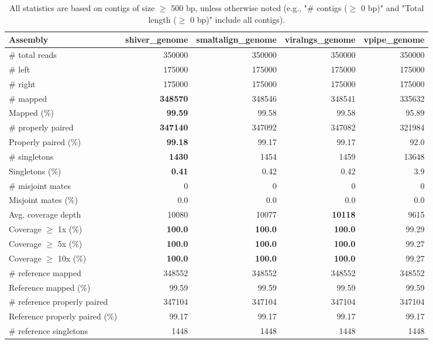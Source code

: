 \documentclass[12pt,a4paper]{article}
\begin{document}
\begin{table}[ht]
\begin{center}
\caption{All statistics are based on contigs of size $\geq$ 500 bp, unless otherwise noted (e.g., "\# contigs ($\geq$ 0 bp)" and "Total length ($\geq$ 0 bp)" include all contigs).}
\begin{tabular}{|l*{4}{|r}|}
\hline
Assembly & shiver\_genome & smaltalign\_genome & viralngs\_genome & vpipe\_genome \\ \hline
\# total reads & 350000 & 350000 & 350000 & 350000 \\ \hline
\# left & 175000 & 175000 & 175000 & 175000 \\ \hline
\# right & 175000 & 175000 & 175000 & 175000 \\ \hline
\# mapped & {\bf 348570} & 348546 & 348541 & 335632 \\ \hline
Mapped (\%) & {\bf 99.59} & 99.58 & 99.58 & 95.89 \\ \hline
\# properly paired & {\bf 347140} & 347092 & 347082 & 321984 \\ \hline
Properly paired (\%) & {\bf 99.18} & 99.17 & 99.17 & 92.0 \\ \hline
\# singletons & {\bf 1430} & 1454 & 1459 & 13648 \\ \hline
Singletons (\%) & {\bf 0.41} & 0.42 & 0.42 & 3.9 \\ \hline
\# misjoint mates & 0 & 0 & 0 & 0 \\ \hline
Misjoint mates (\%) & 0.0 & 0.0 & 0.0 & 0.0 \\ \hline
Avg. coverage depth & 10080 & 10077 & {\bf 10118} & 9615 \\ \hline
Coverage $\geq$ 1x (\%) & {\bf 100.0} & {\bf 100.0} & {\bf 100.0} & 99.29 \\ \hline
Coverage $\geq$ 5x (\%) & {\bf 100.0} & {\bf 100.0} & {\bf 100.0} & 99.27 \\ \hline
Coverage $\geq$ 10x (\%) & {\bf 100.0} & {\bf 100.0} & {\bf 100.0} & 99.27 \\ \hline
\# reference mapped & 348552 & 348552 & 348552 & 348552 \\ \hline
Reference mapped (\%) & 99.59 & 99.59 & 99.59 & 99.59 \\ \hline
\# reference properly paired & 347104 & 347104 & 347104 & 347104 \\ \hline
Reference properly paired (\%) & 99.17 & 99.17 & 99.17 & 99.17 \\ \hline
\# reference singletons & 1448 & 1448 & 1448 & 1448 \\ \hline

\end{tabular}
\end{center}
\end{table}
\end{document}
